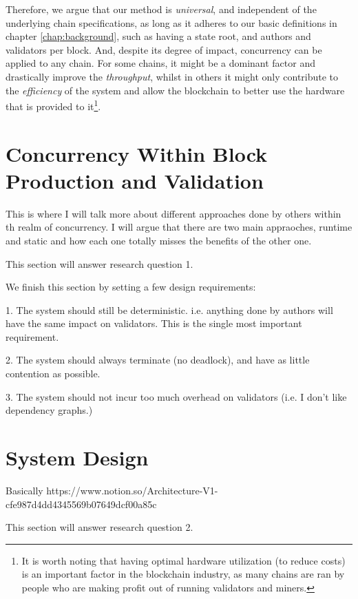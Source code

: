 Therefore, we argue that our method is \textit{universal}, and independent of the underlying chain
specifications, as long as it adheres to our basic definitions in chapter \ref{chap:background},
such as having a state root, and authors and validators per block. And, despite its degree of
impact, concurrency can be applied to any chain. For some chains, it might be a dominant factor and
drastically improve the \textit{throughput}, whilst in others it might only contribute to the
\textit{efficiency} of the system and allow the blockchain to better use the hardware that is
provided to it\footnote{It is worth noting that having optimal hardware utilization (to reduce
costs) is an important factor in the blockchain industry, as many chains are ran by people who are
making profit out of running validators and miners.}.


\section{Concurrency Within Block Production and Validation}

This is where I will talk more about different approaches done by others within th realm of
concurrency. I will argue that there are two main appraoches, runtime and static and how each one
totally misses the benefits of the other one.

This section will answer research question 1.

We finish this section by setting a few design requirements:

1. The system should still be deterministic. i.e. anything done by authors will have the same impact
on validators. This is the single most important requirement.

2. The system should always terminate (no deadlock), and have as little contention as possible.

3. The system should not incur too much overhead on validators (i.e. I don't like dependency
graphs.)

\section{System Design} \label{chap_desgin:sec:design}

Basically https://www.notion.so/Architecture-V1-cfe987d4dd4345569b07649dcf00a85c

This section will answer research question 2.
